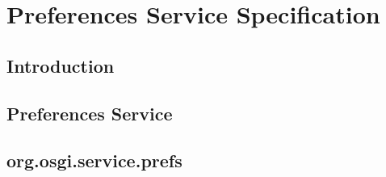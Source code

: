 \chapter{Preferences Service Specification}
\section{Introduction}
\section{Preferences Service}
\section{org.osgi.service.prefs}
